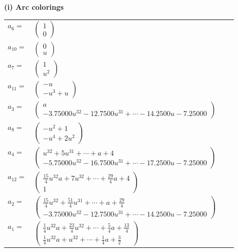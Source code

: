 \documentclass[1p]{elsarticle_modified}
\theoremstyle{definition}
\begin{document}
\flushleft \textbf{(i) Arc colorings}\\
\begin{tabular}{m{7pt} m{180pt} m{7pt} m{180pt} }
\flushright $a_{6}=$&$\begin{pmatrix}1\\0\end{pmatrix}$ \\
\flushright $a_{10}=$&$\begin{pmatrix}0\\u\end{pmatrix}$ \\
\flushright $a_{7}=$&$\begin{pmatrix}1\\u^2\end{pmatrix}$ \\
\flushright $a_{11}=$&$\begin{pmatrix}- u\\- u^3+u\end{pmatrix}$ \\
\flushright $a_{3}=$&$\begin{pmatrix}a\\-3.75000 u^{32}-12.7500 u^{31}+\cdots-14.2500 u-7.25000\end{pmatrix}$ \\
\flushright $a_{8}=$&$\begin{pmatrix}- u^2+1\\- u^4+2 u^2\end{pmatrix}$ \\
\flushright $a_{4}=$&$\begin{pmatrix}u^{32}+5 u^{31}+\cdots+a+4\\-5.75000 u^{32}-16.7500 u^{31}+\cdots-17.2500 u-7.25000\end{pmatrix}$ \\
\flushright $a_{12}=$&$\begin{pmatrix}\frac{15}{4} u^{32} a+7 u^{32}+\cdots+\frac{29}{4} a+4\\1\end{pmatrix}$ \\
\flushright $a_{2}=$&$\begin{pmatrix}\frac{15}{4} u^{32}+\frac{51}{4} u^{31}+\cdots+a+\frac{29}{4}\\-3.75000 u^{32}-12.7500 u^{31}+\cdots-14.2500 u-7.25000\end{pmatrix}$ \\
\flushright $a_{1}=$&$\begin{pmatrix}\frac{1}{4} u^{32} a+\frac{23}{4} u^{32}+\cdots+\frac{5}{4} a+\frac{13}{4}\\\frac{1}{4} u^{32} a+u^{32}+\cdots+\frac{1}{4} a+\frac{3}{2}\end{pmatrix}$ \\

\end{tabular}
\end{document}
